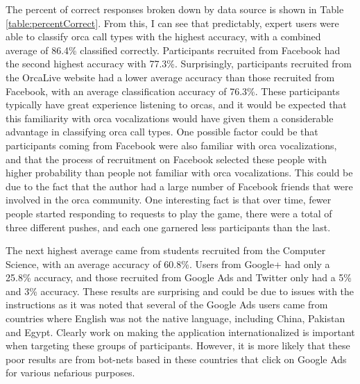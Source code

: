 The percent of correct responses broken down by data source is shown
in Table \ref{table:percentCorrect}.  From this, I can see that
predictably, expert users were able to classify orca call types with the
highest accuracy, with a combined average of 86.4\% classified
correctly.  Participants recruited from Facebook had the second
highest accuracy with 77.3\%.  Surprisingly, participants recruited
from the OrcaLive website had a lower average accuracy than those
recruited from Facebook, with an average classification accuracy of
76.3\%.  These participants typically have great experience listening
to orcas, and it would be expected that this familiarity with orca
vocalizations would have given them a considerable advantage in
classifying orca call types.  One possible factor could be that
participants coming from Facebook were also familiar with orca
vocalizations, and that the process of recruitment on Facebook
selected these people with higher probability than people not familiar
with orca vocalizations.  This could be due to the fact that the
author had a large number of Facebook friends that were involved in
the orca community.  One interesting fact is that over time, fewer
people started responding to requests to play the game, there were a
total of three different pushes, and each one garnered less
participants than the last.

The next highest average came from students recruited from the
Computer Science, with an average accuracy of 60.8\%.  Users from
Google+ had only a 25.8\% accuracy, and those recruited from Google
Ads and Twitter only had a 5\% and 3\% accuracy.  These results are
surprising and could be due to issues with the instructions as it was
noted that several of the Google Ads users came from countries where
English was not the native language, including China, Pakistan and
Egypt.  Clearly work on making the application internationalized is
important when targeting these groups of participants.  However, it is
more likely that these poor results are from bot-nets based in these
countries that click on Google Ads for various nefarious purposes.

